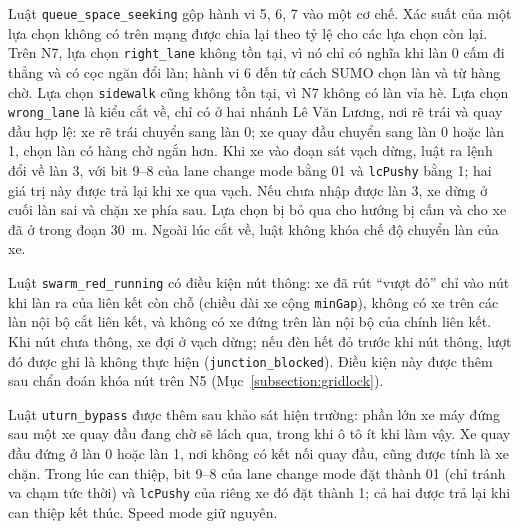 \documentclass[../main.tex]{subfiles}
\begin{document}
Luật \texttt{queue\_space\_seeking} gộp hành vi 5, 6, 7 vào một cơ chế. Xác suất của một lựa chọn không có trên mạng được chia lại theo tỷ lệ cho các lựa chọn còn lại. Trên N7, lựa chọn \texttt{right\_lane} không tồn tại, vì nó chỉ có nghĩa khi làn 0 cấm đi thẳng và có cọc ngăn đổi làn; hành vi 6 đến từ cách SUMO chọn làn và từ hàng chờ. Lựa chọn \texttt{sidewalk} cũng không tồn tại, vì N7 không có làn vỉa hè. Lựa chọn \texttt{wrong\_lane} là kiểu cắt về, chỉ có ở hai nhánh Lê Văn Lương, nơi rẽ trái và quay đầu hợp lệ: xe rẽ trái chuyển sang làn 0; xe quay đầu chuyển sang làn 0 hoặc làn 1, chọn làn có hàng chờ ngắn hơn. Khi xe vào đoạn  sát vạch dừng, luật ra lệnh đổi về làn 3, với bit 9--8 của lane change mode bằng 01 và \texttt{lcPushy} bằng 1; hai giá trị này được trả lại khi xe qua vạch. Nếu chưa nhập được làn 3, xe dừng ở cuối làn sai và chặn xe phía sau. Lựa chọn bị bỏ qua cho hướng bị cấm và cho xe đã ở trong đoạn 30~m. Ngoài lúc cắt về, luật không khóa chế độ chuyển làn của xe.

Luật \texttt{swarm\_red\_running} có điều kiện nút thông: xe đã rút ``vượt đỏ'' chỉ vào nút khi làn ra của liên kết còn chỗ (chiều dài xe cộng \texttt{minGap}), không có xe trên các làn nội bộ cắt liên kết, và không có xe đứng trên làn nội bộ của chính liên kết. Khi nút chưa thông, xe đợi ở vạch dừng; nếu đèn hết đỏ trước khi nút thông, lượt đó được ghi là không thực hiện (\texttt{junction\_blocked}). Điều kiện này được thêm sau chẩn đoán khóa nút trên N5 (Mục~\ref{subsection:gridlock}).

Luật \texttt{uturn\_bypass} được thêm sau khảo sát hiện trường: phần lớn xe máy đứng sau một xe quay đầu đang chờ sẽ lách qua, trong khi ô tô ít khi làm vậy. Xe quay đầu đứng ở làn 0 hoặc làn 1, nơi không có kết nối quay đầu, cũng được tính là xe chặn. Trong lúc can thiệp, bit 9--8 của lane change mode đặt thành 01 (chỉ tránh va chạm tức thời) và \texttt{lcPushy} của riêng xe đó đặt thành 1; cả hai được trả lại khi can thiệp kết thúc. Speed mode giữ nguyên.
\end{document}
